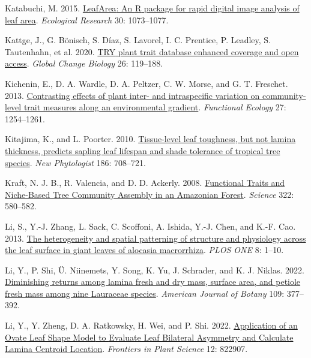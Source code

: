 \documentclass[
  12pt,
  a4paper,
,tablecaptionabove
]{scrartcl}
\newlength{\cslhangindent}
\newenvironment{CSLReferences}[2] %
 {%
  \setlength{\parindent}{0pt}
  \ifodd #1 \everypar{\setlength{\hangindent}{\cslhangindent}}\ignorespaces\fi
  \ifnum #2 > 0
  \setlength{\parskip}{#2\baselineskip}
  \fi
 }%
 {}
\begin{document}
\begin{CSLReferences}{1}{0}
\leavevmode{}%
Katabuchi, M. 2015. \href{https://doi.org/10.1007/s11284-015-1307-x}{{LeafArea}: An {R} package for rapid digital image analysis of leaf area}. \emph{Ecological Research} 30: 1073--1077.

\leavevmode{}%
Kattge, J., G. Bönisch, S. Díaz, S. Lavorel, I. C. Prentice, P. Leadley, S. Tautenhahn, et al. 2020. \href{https://doi.org/10.1111/gcb.14904}{{TRY} plant trait database \textendash{} enhanced coverage and open access}. \emph{Global Change Biology} 26: 119--188.

\leavevmode{}%
Kichenin, E., D. A. Wardle, D. A. Peltzer, C. W. Morse, and G. T. Freschet. 2013. \href{https://doi.org/10.1111/1365-2435.12116}{Contrasting effects of plant inter- and intraspecific variation on community-level trait measures along an environmental gradient}. \emph{Functional Ecology} 27: 1254--1261.

\leavevmode{}%
Kitajima, K., and L. Poorter. 2010. \href{https://doi.org/10.1111/j.1469-8137.2010.03212.x}{Tissue-level leaf toughness, but not lamina thickness, predicts sapling leaf lifespan and shade tolerance of tropical tree species}. \emph{New Phytologist} 186: 708--721.

\leavevmode{}%
Kraft, N. J. B., R. Valencia, and D. D. Ackerly. 2008. \href{https://doi.org/10.1126/science.1160662}{Functional {Traits} and {Niche-Based Tree Community Assembly} in an {Amazonian Forest}}. \emph{Science} 322: 580--582.

\leavevmode{}%
Li, S., Y.-J. Zhang, L. Sack, C. Scoffoni, A. Ishida, Y.-J. Chen, and K.-F. Cao. 2013. \href{https://doi.org/10.1371/journal.pone.0066016}{The heterogeneity and spatial patterning of structure and physiology across the leaf surface in giant leaves of alocasia macrorrhiza}. \emph{PLOS ONE} 8: 1--10.

\leavevmode{}%
Li, Y., P. Shi, Ü. Niinemets, Y. Song, K. Yu, J. Schrader, and K. J. Niklas. 2022. \href{https://doi.org/10.1002/ajb2.1812}{Diminishing returns among lamina fresh and dry mass, surface area, and petiole fresh mass among nine {Lauraceae} species}. \emph{American Journal of Botany} 109: 377--392.

\leavevmode{}%
Li, Y., Y. Zheng, D. A. Ratkowsky, H. Wei, and P. Shi. 2022. \href{https://doi.org/10.3389/fpls.2021.822907}{Application of an {Ovate Leaf Shape Model} to {Evaluate Leaf Bilateral Asymmetry} and {Calculate Lamina Centroid Location}}. \emph{Frontiers in Plant Science} 12: 822907.


\end{CSLReferences}
\end{document}
